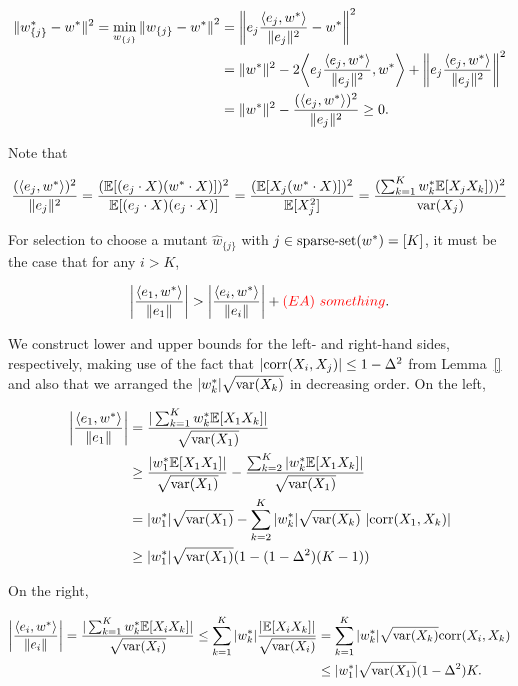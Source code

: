 \begin{align*}
\Vert w^*_{\{j\}} - w^* \Vert^2 = \min_{w_{\{j\}}}{\Vert w_{\{j\}} - w^* \Vert}^2
&= \bigg \Vert e_j \frac{\langle e_j, w^* \rangle}{\Vert e_j \Vert^2} - w^* \bigg \Vert^2 \\
&= \Vert w^* \Vert^2 - 2 \bigg \langle e_j \frac{\langle e_j, w^* \rangle}{\Vert e_j \Vert^2}, w^* \bigg \rangle + \bigg \Vert e_j \frac{\langle e_j, w^* \rangle}{\Vert e_j \Vert^2} \bigg \Vert^2 \\
&= \Vert w^* \Vert^2 - \frac{(\langle e_j, w^* \rangle)^2}{\Vert e_j \Vert^2} \ge 0.
\end{align*}

\noindent Note that

\[
\frac{(\langle e_j, w^* \rangle)^2}{\Vert e_j \Vert^2}
= \frac{(\mathbb{E}[(e_j \cdot X)(w^* \cdot X)])^2}{\mathbb{E}[(e_j \cdot X)(e_j \cdot X)]}
= \frac{(\mathbb{E}[X_j (w^* \cdot X)])^2}{\mathbb{E}[X_j^2]}
= \frac{(\sum_{k=1}^K w^*_k \mathbb{E}[X_j X_k]))^2}{\mathrm{var}(X_j)}
\]

For selection to choose a mutant $\hat{w}_{\{j\}}$ with
$j \in \mathrm{sparse\mbox{-}set}(w^*) = [K]$, it must be the case that for any $i > K$,

\[
\bigg\vert \frac{\langle e_1, w^* \rangle}{\Vert e_1 \Vert} \bigg\vert
> \bigg\vert \frac{\langle e_i, w^* \rangle}{\Vert e_i \Vert} \bigg\vert + {\color{red} (EA) ~something}.
\]

We construct lower and upper bounds for the left- and right-hand sides,
respectively, making use of the fact that
$|\mathrm{corr}(X_i, X_j)| \leq 1 - \Delta^2$ from Lemma~\ref{} and also
that we arranged the $\vert w^*_k \vert \sqrt{\mathrm{var}(X_k)}$ in decreasing order.
On the left,

\begin{align*}
\bigg\vert \frac{\langle e_1, w^* \rangle}{\Vert e_1 \Vert} \bigg\vert
&= \frac{\vert\sum_{k=1}^K w^*_k \mathbb{E}[X_1 X_k]\vert}{\sqrt{\mathrm{var}(X_1)}} \\
&\ge \frac{\vert w^*_1 \mathbb{E}[X_1 X_1]\vert}{\sqrt{\mathrm{var}(X_1)}} - \frac{\sum_{k=2}^K \vert w^*_k \mathbb{E}[X_1 X_k] \vert}{\sqrt{\mathrm{var}(X_1)}} \\
&= \vert w^*_1 \vert \sqrt{\mathrm{var}(X_1)} - \sum_{k=2}^K \vert w^*_k \vert \sqrt{\mathrm{var}(X_k)}~\vert \mathrm{corr}(X_1, X_k) \vert \\
&\ge \vert w^*_1 \vert \sqrt{\mathrm{var}(X_1)}(1 - (1 - \Delta^2) (K-1))
\end{align*}

\noindent On the right,

\begin{align*}
\bigg\vert \frac{\langle e_i, w^* \rangle}{\Vert e_i \Vert} \bigg\vert
= \frac{\vert\sum_{k=1}^K w^*_k \mathbb{E}[X_i X_k]\vert}{\sqrt{\mathrm{var}(X_i)}}
\le \sum_{k=1}^K \vert w^*_k \vert \frac{\vert \mathbb{E}[X_i X_k]\vert}{\sqrt{\mathrm{var}(X_i)}}
&= \sum_{k=1}^K \vert w^*_k \vert \sqrt{\mathrm{var}(X_k)} \mathrm{corr}(X_i, X_k) \\
&\le \vert w^*_1 \vert \sqrt{\mathrm{var}(X_1)} (1 - \Delta^2) K.
\end{align*}

